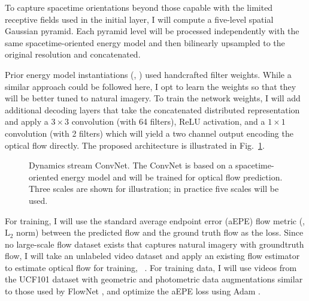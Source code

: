 To capture spacetime orientations beyond those capable
with the limited receptive fields used in the initial
layer, I will compute a five-level spatial Gaussian pyramid.
Each pyramid level will be
processed independently
with the same spacetime-oriented energy model and then
bilinearly upsampled to the original resolution and
concatenated.

Prior energy model instantiations (\eg,
\cite{adelson1985spatiotemporal,derpanis2012spacetime,simoncelli1998})
used handcrafted filter weights.
While a similar approach could be followed here, I
opt to learn the weights so that they will be better
tuned to natural imagery.
To train the network weights, I will add additional decoding
layers that take the concatenated distributed
representation and apply a $3\times 3$ convolution
(with 64 filters), ReLU activation, and a $1\times 1$
convolution (with 2 filters) which will yield a two channel
output encoding the optical flow directly.
The proposed architecture is illustrated in
Fig.\ \ref{fig:MSOE}.

\begin{figure}[t]
\begin{center}
\end{center}
\vspace{-0.45cm}
\caption{Dynamics stream ConvNet. The ConvNet is based on a
spacetime-oriented energy model
\cite{derpanis2012spacetime, simoncelli1998} and will be trained
for optical flow prediction.
Three scales are shown for illustration;
in practice five scales will be used.}
\label{fig:MSOE}
\end{figure}

For training, I will use the standard average
endpoint error (aEPE) flow metric (\ie, $\text{L}_2$
norm) between the predicted flow and the ground truth
flow as the loss.
Since no large-scale flow dataset exists that captures
natural imagery with groundtruth flow, I will take an
unlabeled video dataset and apply an existing flow
estimator \cite{revaud2015epicflow} to estimate optical
flow for training,
\cf\ \cite{tran2016}.
For training data, I will use videos from the UCF101
dataset \cite{soomro2012ucf101} with geometric
and photometric data augmentations similar to those used
by FlowNet \cite{dosovitskiy2015}, and optimize the aEPE loss using
Adam \cite{kingma2017}.

